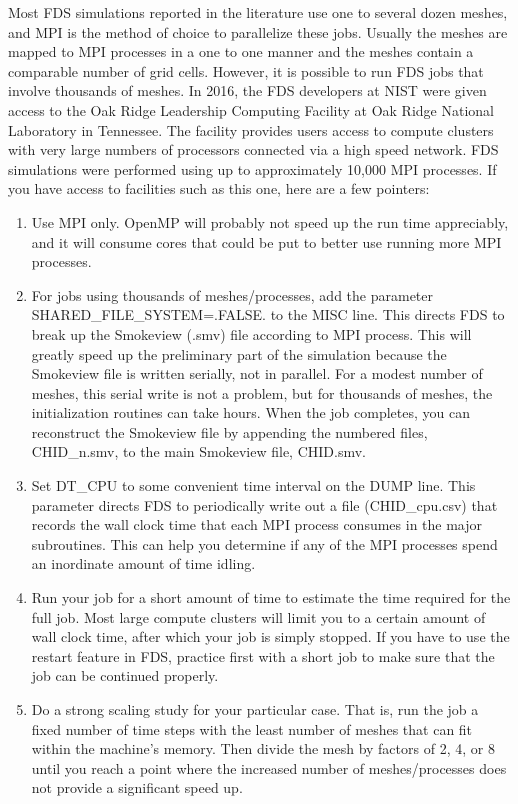 \documentclass[11pt]{book}
\begin{document}
Most FDS simulations reported in the literature use one to several dozen meshes, and MPI is the method of choice to parallelize these jobs. Usually the meshes are mapped to MPI processes in a one to one manner and the meshes contain a comparable number of grid cells. However, it is possible to run FDS jobs that involve thousands of meshes. In 2016, the FDS developers at NIST were given access to the Oak Ridge Leadership Computing Facility at Oak Ridge National Laboratory in Tennessee. The facility provides users access to compute clusters with very large numbers of processors connected via a high speed network. FDS simulations were performed using up to approximately 10,000 MPI processes. If you have access to facilities such as this one, here are a few pointers:
\begin{enumerate}
\item Use MPI only. OpenMP will probably not speed up the run time appreciably, and it will consume cores that could be put to better use running more MPI processes.
\item For jobs using thousands of meshes/processes, add the parameter {\ct SHARED\_FILE\_SYSTEM=.FALSE.} to the {\ct MISC} line. This directs FDS to break up the Smokeview ({\ct .smv}) file according to MPI process. This will greatly speed up the preliminary part of the simulation because the Smokeview file is written serially, not in parallel. For a modest number of meshes, this serial write is not a problem, but for thousands of meshes, the initialization routines can take hours. When the job completes, you can reconstruct the Smokeview file by appending the numbered files, {\ct CHID\_n.smv}, to the main Smokeview file, {\ct CHID.smv}.
\item Set {\ct DT\_CPU} to some convenient time interval on the {\ct DUMP} line. This parameter directs FDS to periodically write out a file ({\ct CHID\_cpu.csv}) that records the wall clock time that each MPI process consumes in the major subroutines. This can help you determine if any of the MPI processes spend an inordinate amount of time idling.
\item Run your job for a short amount of time to estimate the time required for the full job. Most large compute clusters will limit you to a certain amount of wall clock time, after which your job is simply stopped. If you have to use the restart feature in FDS, practice first with a short job to make sure that the job can be continued properly.
\item Do a strong scaling study for your particular case. That is, run the job a fixed number of time steps with the least number of meshes that can fit within the machine's memory. Then divide the mesh by factors of 2, 4, or 8 until you reach a point where the increased number of meshes/processes does not provide a significant speed up.
\end{enumerate}
\end{document}
